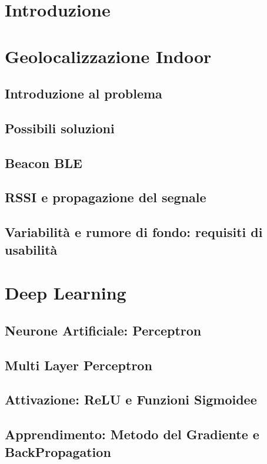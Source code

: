 \documentclass[12pt]{report}
\begin{document}
\tableofcontents

\begin{abstract}

\end{abstract}

\chapter{Introduzione}

\chapter{Geolocalizzazione Indoor}
\section{Introduzione al problema}
\section{Possibili soluzioni}
\section{Beacon BLE}
\section{RSSI e propagazione del segnale}
\section{Variabilità e rumore di fondo: requisiti di usabilità}

\chapter{Deep Learning}
\section{Neurone Artificiale: Perceptron}
\section{Multi Layer Perceptron}
\section{Attivazione: ReLU e Funzioni Sigmoidee}
\section{Apprendimento: Metodo del Gradiente e BackPropagation}
\end{document}
